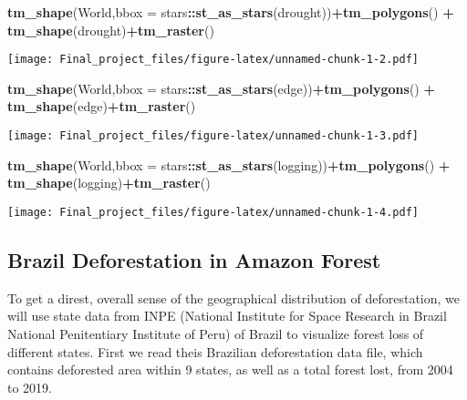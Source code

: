 \documentclass[
]{article}
\newenvironment{Shaded}{\begin{snugshade}}{\end{snugshade}}
\newcommand{\AttributeTok}[1]{\textcolor[rgb]{0.13,0.29,0.53}{#1}}
\newcommand{\FunctionTok}[1]{\textcolor[rgb]{0.13,0.29,0.53}{\textbf{#1}}}
\newcommand{\NormalTok}[1]{#1}
\newcommand{\SpecialCharTok}[1]{\textcolor[rgb]{0.81,0.36,0.00}{\textbf{#1}}}
\begin{document}
\begin{Shaded}
\begin{Highlighting}[]
\FunctionTok{tm\_shape}\NormalTok{(World,}\AttributeTok{bbox =}\NormalTok{ stars}\SpecialCharTok{::}\FunctionTok{st\_as\_stars}\NormalTok{(drought))}\SpecialCharTok{+}\FunctionTok{tm\_polygons}\NormalTok{() }\SpecialCharTok{+}
  \FunctionTok{tm\_shape}\NormalTok{(drought)}\SpecialCharTok{+}\FunctionTok{tm\_raster}\NormalTok{()}
\end{Highlighting}
\end{Shaded}

\texttt{[image: Final\_project\_files/figure-latex/unnamed-chunk-1-2.pdf]}

\begin{Shaded}
\begin{Highlighting}[]
\FunctionTok{tm\_shape}\NormalTok{(World,}\AttributeTok{bbox =}\NormalTok{ stars}\SpecialCharTok{::}\FunctionTok{st\_as\_stars}\NormalTok{(edge))}\SpecialCharTok{+}\FunctionTok{tm\_polygons}\NormalTok{() }\SpecialCharTok{+}
  \FunctionTok{tm\_shape}\NormalTok{(edge)}\SpecialCharTok{+}\FunctionTok{tm\_raster}\NormalTok{()}
\end{Highlighting}
\end{Shaded}

\texttt{[image: Final\_project\_files/figure-latex/unnamed-chunk-1-3.pdf]}

\begin{Shaded}
\begin{Highlighting}[]
\FunctionTok{tm\_shape}\NormalTok{(World,}\AttributeTok{bbox =}\NormalTok{ stars}\SpecialCharTok{::}\FunctionTok{st\_as\_stars}\NormalTok{(logging))}\SpecialCharTok{+}\FunctionTok{tm\_polygons}\NormalTok{() }\SpecialCharTok{+}
  \FunctionTok{tm\_shape}\NormalTok{(logging)}\SpecialCharTok{+}\FunctionTok{tm\_raster}\NormalTok{()}
\end{Highlighting}
\end{Shaded}

\texttt{[image: Final\_project\_files/figure-latex/unnamed-chunk-1-4.pdf]}

\hypertarget{brazil-deforestation-in-amazon-forest}{%
\subsection{Brazil Deforestation in Amazon
Forest}\label{brazil-deforestation-in-amazon-forest}}

To get a direst, overall sense of the geographical distribution of
deforestation, we will use state data from INPE (National Institute for
Space Research in Brazil National Penitentiary Institute of Peru) of
Brazil to visualize forest loss of different states. First we read theis
Brazilian deforestation data file, which contains deforested area within
9 states, as well as a total forest lost, from 2004 to 2019.
\end{document}

